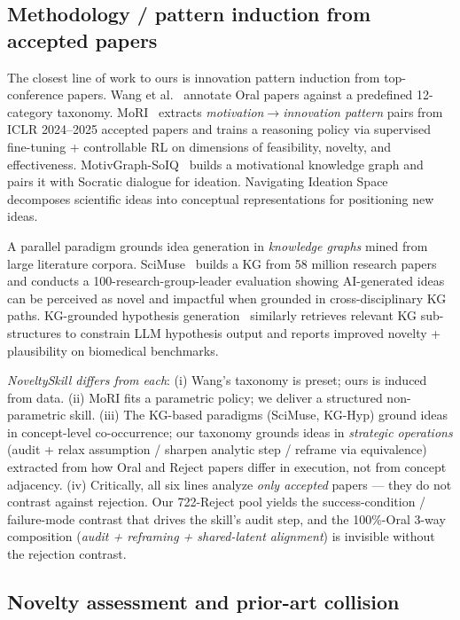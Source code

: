 \documentclass[10pt,a4paper]{article}
\begin{document}
\subsection{Methodology / pattern induction from accepted papers}
\label{subsec:related-induction}

The closest line of work to ours is innovation pattern induction from top-conference papers. Wang et al.~\cite{wang2024scireasoning} annotate Oral papers against a predefined 12-category taxonomy. MoRI~\cite{moRI2026} extracts \emph{motivation}\(\to\)\emph{innovation pattern} pairs from ICLR 2024--2025 accepted papers and trains a reasoning policy via supervised fine-tuning + controllable RL on dimensions of feasibility, novelty, and effectiveness. MotivGraph-SoIQ~\cite{motivgraph2025} builds a motivational knowledge graph and pairs it with Socratic dialogue for ideation. Navigating Ideation Space~\cite{navigating_ideation2026} decomposes scientific ideas into conceptual representations for positioning new ideas.

A parallel paradigm grounds idea generation in \emph{knowledge graphs} mined from large literature corpora. SciMuse~\cite{scimuse2024} builds a KG from 58 million research papers and conducts a 100-research-group-leader evaluation showing AI-generated ideas can be perceived as novel and impactful when grounded in cross-disciplinary KG paths. KG-grounded hypothesis generation~\cite{kghyp2024} similarly retrieves relevant KG sub-structures to constrain LLM hypothesis output and reports improved novelty + plausibility on biomedical benchmarks.

\emph{NoveltySkill differs from each}: (i) Wang's taxonomy is preset; ours is induced from data. (ii) MoRI fits a parametric policy; we deliver a structured non-parametric skill. (iii) The KG-based paradigms (SciMuse, KG-Hyp) ground ideas in concept-level co-occurrence; our taxonomy grounds ideas in \emph{strategic operations} (audit + relax assumption / sharpen analytic step / reframe via equivalence) extracted from how Oral and Reject papers differ in execution, not from concept adjacency. (iv) Critically, all six lines analyze \emph{only accepted} papers --- they do not contrast against rejection. Our 722-Reject pool yields the success-condition / failure-mode contrast that drives the skill's audit step, and the 100\%-Oral 3-way composition (\emph{audit + reframing + shared-latent alignment}) is invisible without the rejection contrast.

\subsection{Novelty assessment and prior-art collision}
\label{subsec:related-novelty}
\end{document}
